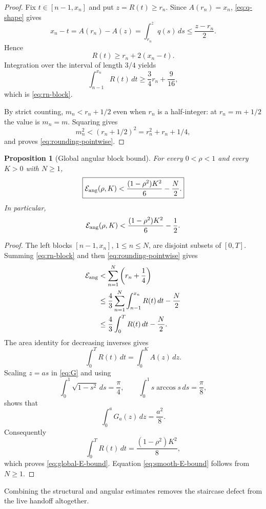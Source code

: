 \documentclass[11pt]{article}
\newtheorem{proposition}[lemma]{Proposition}
\theoremstyle{remark}
\begin{document}
\begin{proof}
Fix $t\in[n-1,x_n]$ and put $z=R(t)\geq r_n$.  Since
$A(r_n)=x_n$, \eqref{eq:q-shape} gives
\[
 x_n-t=A(r_n)-A(z)
 =\int_{r_n}^{z}q(s)\,ds
 \leq\frac{z-r_n}{2}.
\]
Hence
\[
 R(t)\geq r_n+2(x_n-t).
\]
Integration over the interval of length $3/4$ yields
\[
 \int_{n-1}^{x_n}R(t)\,dt
 \geq\frac34r_n+\frac9{16},
\]
which is \eqref{eq:rn-block}.

By strict counting, $m_n<r_n+1/2$ even when $r_n$ is a half-integer:
at $r_n=m+1/2$ the value is $m_n=m$.  Squaring gives
\[
 m_n^2<(r_n+1/2)^2=r_n^2+r_n+1/4,
\]
and proves \eqref{eq:rounding-pointwise}.
\end{proof}

\begin{proposition}[Global angular block bound]
\label{prop:global-E}
For every $0<\rho<1$ and every $K>0$ with $N\geq1$,
\begin{equation}
 \boxed{
 \mathcal E_{\rm ang}(\rho,K)
 <\frac{(1-\rho^2)K^2}{6}-\frac N2.}
 \label{eq:global-E-bound}
\end{equation}
In particular,
\begin{equation}
 \mathcal E_{\rm ang}(\rho,K)
 <\frac{(1-\rho^2)K^2}{6}-\frac12.
 \label{eq:smooth-E-bound}
\end{equation}
\end{proposition}

\begin{proof}
The left blocks $[n-1,x_n]$, $1\leq n\leq N$, are disjoint subsets of
$[0,T]$.  Summing \eqref{eq:rn-block} and then
\eqref{eq:rounding-pointwise} gives
\begin{align*}
 \mathcal E_{\rm ang}
 &<\sum_{n=1}^N\left(r_n+\frac14\right)\\
 &\leq\frac43\sum_{n=1}^N
       \int_{n-1}^{x_n}R(t)\,dt-\frac N2\\
 &\leq\frac43\int_0^T R(t)\,dt-\frac N2.
\end{align*}
The area identity for decreasing inverses gives
\[
 \int_0^T R(t)\,dt=\int_0^K A(z)\,dz.
\]
Scaling $z=as$ in \eqref{eq:G} and using
\[
 \int_0^1\sqrt{1-s^2}\,ds=\frac\pi4,
 \qquad
 \int_0^1s\arccos s\,ds=\frac\pi8,
\]
shows that
\[
 \int_0^aG_a(z)\,dz=\frac{a^2}{8}.
\]
Consequently
\[
 \int_0^T R(t)\,dt=\frac{(1-\rho^2)K^2}{8},
\]
which proves \eqref{eq:global-E-bound}.  Equation
\eqref{eq:smooth-E-bound} follows from $N\geq1$.
\end{proof}

Combining the structural and angular estimates removes the staircase defect
from the live handoff altogether.
\end{document}
